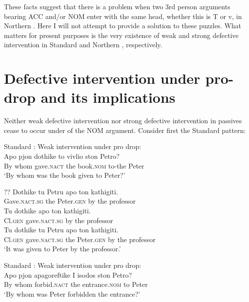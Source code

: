 \documentclass[output=paper]{LSP/langsci}
\begin{document}
These facts suggest that there is a problem when two 3rd person arguments bearing ACC and/or NOM enter  with the same head, whether this is T or v, in Northern . Here I will not attempt to provide a solution to these puzzles. What matters for present purposes is the very existence of weak and strong defective intervention in Standard and Northern , respectively. 



\section{Defective intervention under pro-drop and its implications}


Neither weak defective intervention nor strong defective intervention in passives cease to occur under  of the NOM argument. Consider first the Standard  pattern: 


\ea%
\label{ex:anagnost:23}
Standard : Weak intervention under pro drop:\\

\gll Apo pjon dothike to vivlio ston Petro?\\
 By whom gave.\textsc{nact} the  book.\textsc{nom} to-the Peter\\
\glt ‘By whom was the book given to Peter?’ 

\gll  ?? Dothike tu Petru apo ton kathigiti.\\
{} Gave.\textsc{nact.sg} the Peter.\textsc{gen} by the professor\\
 
\gll Tu dothike apo  ton kathigiti.\\
Cl.\textsc{gen} gave.\textsc{nact.sg} by the professor\\
 
\gll Tu dothike tu Petru apo ton kathigiti.\\
Cl.\textsc{gen} gave.\textsc{nact.sg} the Peter.\textsc{gen} by the professor\\

\glt 
‘It was given to Peter by the professor.’
\z 



\ea%
\label{ex:anagnost:24}
Standard : Weak intervention under pro drop:\\
\gll Apo pjon apagoreftike I isodos ston Petro?\\
 By whom forbid.\textsc{nact} the entrance.\textsc{nom} to Peter\\
\glt ‘By whom was Peter forbidden the entrance?’
 
\end{document}

